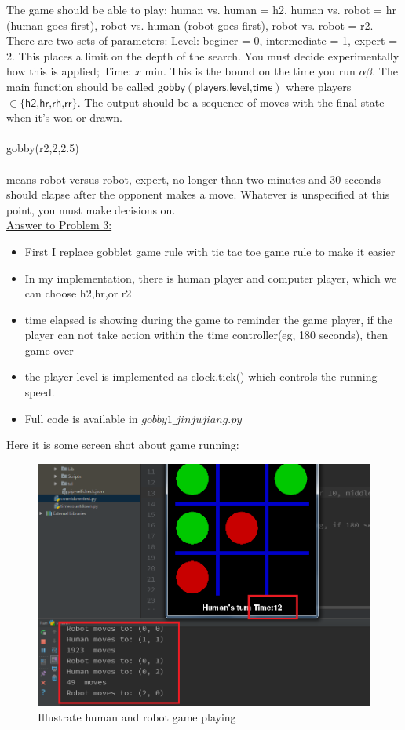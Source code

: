 \documentclass{article}
\begin{document}
\begin{enumerate}
The game should be able to play: human vs. human = h2, human vs. robot = hr (human goes first),
robot vs. human (robot goes first), robot vs. robot = r2. There are two sets of parameters: Level:
beginer = 0, intermediate = 1, expert = 2. This places a limit on the depth of the search. You must
decide experimentally how this is applied; Time: $x$ min. This is the bound on the time you run $\alpha\beta.$ The main function should be called $ \textsf{gobby} (\textsf{players,level,time})$ where players $\in \{\textsf{h2,hr,rh,rr}\}$. The
output should be a sequence of moves with the final state when it's won or drawn.
\\
\\
\textsf{gobby(r2,2,2.5)}
\\
\\
 means robot versus robot, expert, no longer than two minutes and 30 seconds should elapse after the
opponent makes a move. Whatever is unspecified at this point, you must make decisions on.\\
\underline{Answer to Problem 3:}
\begin{itemize}
\item First I replace gobblet game rule with tic tac toe game rule to make it easier
\item In my implementation, there is human player and computer player, which we can choose h2,hr,or r2
\item time elapsed is showing during the game to reminder the game player, if the player can not take action within the time controller(eg, 180 seconds), then game over
\item the player level is implemented as clock.tick() which controls the running speed.
\item Full code is available in $gobby1\_jinjujiang.py$
\end{itemize}
Here it is some screen shot about game running:\\
\begin{figure}[h]
\includegraphics[width=0.9\columnwidth]{hw3_q3_1}\centering 
\caption{Illustrate human and robot game playing}
\end{figure}
\pagebreak



\end{enumerate}
\end{document}
